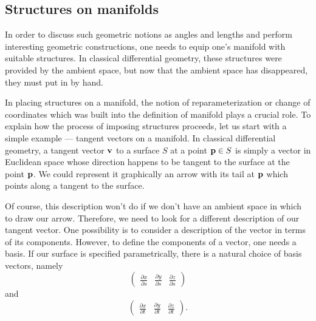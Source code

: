 \documentclass[12pt]{article}
\begin{document}
\subsection{Structures on manifolds}

In order to discuss such geometric notions as angles and lengths and
perform interesting geometric constructions, one needs to equip one's
manifold with suitable structures.  In classical differential
geometry, these structures were provided by the ambient space, but now
that the ambient space has disappeared, they must put in by hand.

In placing structures on a manifold, the notion of reparameterization
or change of coordinates which was built into the definition of
manifold plays a crucial role.  To explain how the process of imposing
structures proceeds, let us start with a simple example --- tangent
vectors on a manifold.  In classical differential geometry, a tangent
vector ${\bf v}$ to a surface $S$ at a point ${\bf p} \in S$ is simply
a vector in Euclidean space whose direction happens to be tangent to
the surface at the point ${\bf p}$.  We could represent it graphically
an arrow with its tail at ${\bf p}$ which points along a tangent to
the surface.

Of course, this description won't do if we don't have an ambient space
 in which to draw our arrow.  Therefore, we need to look for a
 different description of our tangent vector.  One possibility is to
 consider a description of the vector in terms of its components.
 However, to define the components of a vector, one needs a basis.  If
 our surface is specified parametrically, there is a natural choice of
 basis vectors, namely 
 \[\begin{pmatrix} \displaystyle \frac{\partial x}{\partial s}
 & \displaystyle \frac{\partial y}{\partial s} & \displaystyle \frac{\partial z}{\partial s}
 \end{pmatrix}\] 
and 
 \[\begin{pmatrix} \displaystyle \frac{\partial x}{\partial t} &
 \displaystyle \frac{\partial y}{\partial t} & \displaystyle \frac{\partial z}{\partial t}
 \end{pmatrix}.\]
\end{document}
